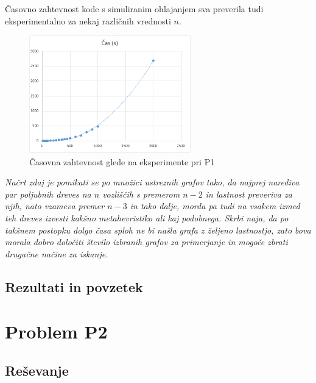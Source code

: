 \documentclass[a4paper, 12 pt]{article}
\begin{document}
Časovno zahtevnost kode s simuliranim ohlajanjem sva preverila tudi eksperimentalno za nekaj različnih vrednosti $n$.

\begin{figure}[H]
\centering
  \includegraphics[width=7cm]{p1_casovna_slika.png}
  \caption{Časovna zahtevnost glede na eksperimente pri P1}
  \label{fig:p1_časovna_zaht} 
\end{figure}


\vspace{1cm}




\itshape{ Načrt zdaj je pomikati se po množici ustreznih grafov tako, da najprej narediva par poljubnih dreves na $n$ vozliščih s premerom $n - 2$ in lastnost preveriva za njih, nato vzameva premer $n - 3$ in tako dalje, morda pa tudi na vsakem izmed teh dreves izvesti kakšno metahevristiko ali kaj podobnega. Skrbi naju, da po takšnem postopku dolgo časa sploh ne bi našla grafa z željeno lastnostjo, zato bova morala dobro določiti število izbranih grafov za primerjanje in mogoče zbrati drugačne načine za iskanje.
}

\subsection{Rezultati in povzetek}


\pagebreak

\section{Problem P2}

\subsection{Reševanje}

\end{document}
